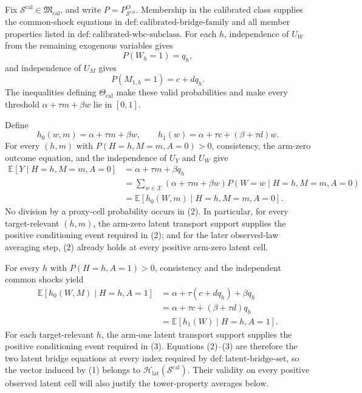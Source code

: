 Fix \(\mathcal S^{\mathrm{cal}}\in\mathfrak M_{\mathrm{cal}}\), and write
\(P=P_{\mathcal S^{\mathrm{cal}}}^O\).  Membership in the calibrated class supplies
the common-shock equations in \(\mathrm{def{:}calibrated\text{-}bridge\text{-}family}\)
and all member properties listed in \(\mathrm{def{:}calibrated\text{-}wbc\text{-}subclass}\).
For each \(h\), independence of \(U_W\) from the remaining exogenous variables gives
\[
 P(W_h=1)=q_h,
\]
and independence of \(U_M\) gives
\[
 P(M_{1,h}=1)=c+dq_h.
\]
The inequalities defining \(\Theta_{\mathrm{cal}}\) make these valid probabilities
and make every threshold \(\alpha+\tau m+\beta w\) lie in \([0,1]\).

Define
\[
 h_0(w,m)=\alpha+\tau m+\beta w,
 \qquad
 h_1(w)=\alpha+\tau c+(\beta+\tau d)w.
 \tag{1}
\]
For every \((h,m)\) with \(P(H=h,M=m,A=0)>0\), consistency, the arm-zero
outcome equation, and the independence of \(U_Y\) and \(U_W\) give
\[
 \begin{aligned}
 \mathbb E[Y\mid H=h,M=m,A=0]
 &=\alpha+\tau m+\beta q_h\\
 &=\sum_{w\in\mathcal X}(\alpha+\tau m+\beta w)
          P(W=w\mid H=h,M=m,A=0)\\
 &=\mathbb E[h_0(W,m)\mid H=h,M=m,A=0].
 \end{aligned}
 \tag{2}
\]
No division by a proxy-cell probability occurs in (2).  In particular, for every
target-relevant \((h,m)\), the arm-zero latent transport support supplies the positive
conditioning event required in (2); and for the later observed-law averaging step,
(2) already holds at every positive arm-zero latent cell.

For every \(h\) with \(P(H=h,A=1)>0\), consistency and the independent common
shocks yield
\[
 \begin{aligned}
 \mathbb E[h_0(W,M)\mid H=h,A=1]
 &=\alpha+\tau(c+dq_h)+\beta q_h\\
 &=\alpha+\tau c+(\beta+\tau d)q_h\\
 &=\mathbb E[h_1(W)\mid H=h,A=1].
 \end{aligned}
 \tag{3}
\]
For each target-relevant \(h\), the arm-one latent transport support supplies the
positive conditioning event required in (3).  Equations (2)--(3) are therefore the
two latent bridge equations at every index required by
\(\mathrm{def{:}latent\text{-}bridge\text{-}set}\), so the vector induced by (1)
belongs to \(\mathcal H_{\mathrm{lat}}(\mathcal S^{\mathrm{cal}})\).  Their validity
on every positive observed latent cell will also justify the tower-property averages
below.

